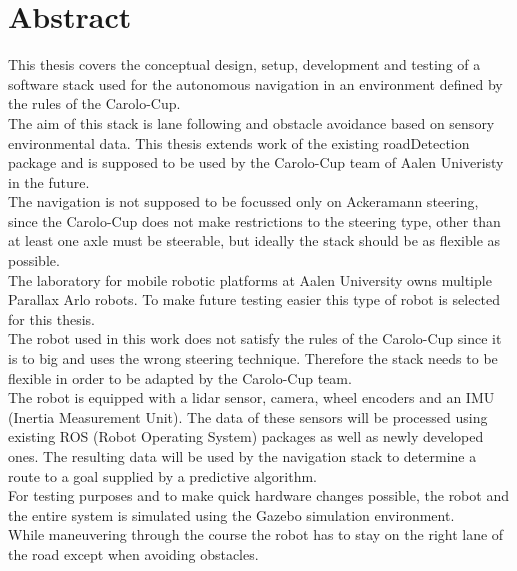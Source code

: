 \chapter*{Abstract}
\label{abstract}
This thesis covers the conceptual design, setup, development and testing of a software stack used for the autonomous navigation in an environment defined by the rules of the Carolo-Cup.\\

 The aim of this stack is lane following and obstacle avoidance based on sensory environmental data. This thesis extends work of the existing roadDetection package and is supposed to be used by the Carolo-Cup team of Aalen Univeristy in the future.\\
 
 The navigation is not supposed to be focussed only on Ackeramann steering, since the Carolo-Cup does not make restrictions to the steering type, other than at least one axle must be steerable, but ideally the stack should be as flexible as possible\cite{carolocup}.\\
 The laboratory for mobile robotic platforms at Aalen University owns multiple Parallax Arlo robots. To make future testing easier this type of robot is selected for this thesis.\\

 The robot used in this work does not satisfy the rules of the Carolo-Cup since it is to big and uses the wrong steering technique. Therefore the stack needs to be flexible in order to be adapted by the Carolo-Cup team.\\

The robot is equipped with a lidar sensor, camera, wheel encoders and an IMU (Inertia Measurement Unit). The data of these sensors will be processed using existing ROS (Robot Operating System) packages as well as newly developed ones. The resulting data will be used by the navigation stack to determine a route to a goal supplied by a predictive algorithm.\\

For testing purposes and to make quick hardware changes possible, the robot and the entire system is simulated using the Gazebo simulation environment.\\

While maneuvering through the course the robot has to stay on the right lane of the road except when avoiding obstacles.